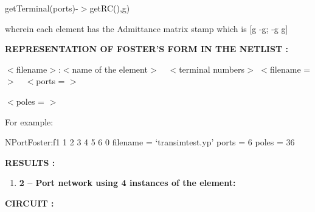 \documentclass{article}
\begin{document}
getTerminal(ports)-$>$getRC(),g)

wherein each element has the Admittance matrix stamp which is [g -g; -g g]



\textbf{REPRESENTATION OF FOSTER'S FORM IN THE NETLIST :}

\textbf{$<$}filename$>$:$<$name of the element$> \quad <$terminal numbers$>$
$<$filename = $> \quad <$ports = $>$

$<$poles = $>$

For example:

NPortFoster:f1 1 2 3 4 5 6 0 filename = `transimtest.yp' ports = 6 poles =
36

\noindent\textbf{RESULTS :}

\begin{enumerate}
\item \textbf{2 -- Port network using 4 instances of the element:}
\end{enumerate}

\noindent\textbf{CIRCUIT :}
\end{document}
